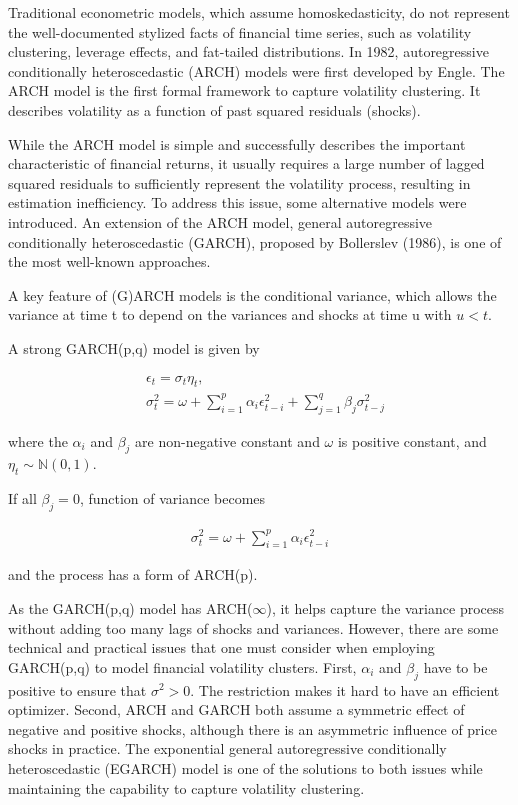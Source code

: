 \documentclass[12pt,a4paper]{article}
\numberwithin{equation}{section}
\begin{document}
Traditional econometric models, which assume homoskedasticity, do not represent the well-documented stylized facts of financial time series, such as volatility clustering, leverage effects, and fat-tailed distributions. In 1982, autoregressive conditionally heteroscedastic (ARCH) models were first developed by Engle. The ARCH model is the first formal framework to capture volatility clustering. It describes volatility as a function of past squared residuals (shocks).

While the ARCH model is simple and successfully describes the important characteristic of financial returns, it usually requires a large number of lagged squared residuals to sufficiently represent the volatility process, resulting in estimation inefficiency. To address this issue, some alternative models were introduced. An extension of the ARCH model, general autoregressive conditionally heteroscedastic (GARCH),  proposed by Bollerslev (1986), is one of the most well-known approaches.

A key feature of (G)ARCH models is the conditional variance, which allows the variance at time t to depend on the variances and shocks at time u with $u<t$.

A strong GARCH(p,q) model is given by

 \begin{align*}
 &\epsilon_t = \sigma_t \eta_t,\\[0.6em]
 &\sigma_t^2 = \omega + \sum_{i=1}^p \alpha_i \epsilon_{t-i}^2+ \sum_{j=1}^q \beta_j \sigma_{t-j}^2
 \end{align*}
 
 where the $\alpha_i$ and $\beta_j$ are non-negative constant and $\omega$ is positive constant, and $\eta_t \sim \mathbb{N}(0,1)$.

If all $\beta_j =0$, function of variance becomes


 \begin{align*}
 \sigma_t^2 = \omega + \sum_{i=1}^p \alpha_i \epsilon_{t-i}^2
 \end{align*}
 
 and the process has a form of ARCH(p).
 
As the GARCH(p,q) model has ARCH($\infty$), it helps capture the variance process without adding too many lags of shocks and variances. However, there are some technical and practical issues that one must consider when employing GARCH(p,q) to model financial volatility clusters. First, $\alpha_i$ and $\beta_j$ have to be positive to ensure that $\sigma^2 >0$. The restriction makes it hard to have an efficient optimizer. Second, ARCH and GARCH both assume a symmetric effect of negative and positive shocks, although there is an asymmetric influence of price shocks in practice. The exponential general autoregressive conditionally heteroscedastic (EGARCH) model is one of the solutions to both issues while maintaining the capability to capture volatility clustering.
\end{document}
